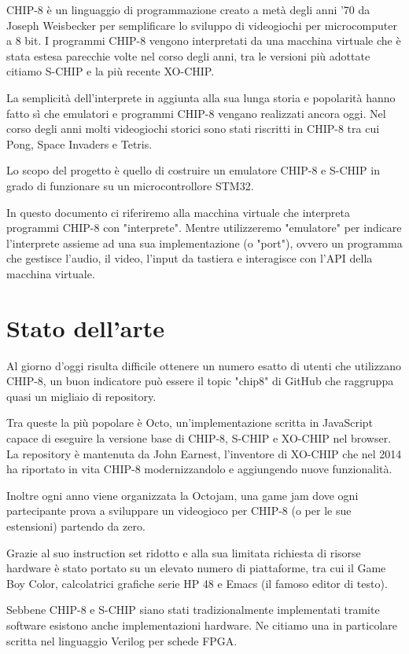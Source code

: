 \documentclass[a4paper]{article}
\begin{document}
CHIP-8 è un linguaggio di programmazione creato a metà degli anni '70
da Joseph Weisbecker per semplificare lo sviluppo di videogiochi per
microcomputer a 8 bit. I programmi CHIP-8 vengono interpretati da una
macchina virtuale che è stata estesa parecchie volte nel corso degli
anni, tra le versioni più adottate citiamo S-CHIP e la più recente
XO-CHIP.

La semplicità dell'interprete in aggiunta alla sua lunga storia e
popolarità hanno fatto sì che emulatori e programmi CHIP-8 vengano
realizzati ancora oggi.
Nel corso degli anni molti videogiochi storici sono stati riscritti
in CHIP-8 tra cui Pong, Space Invaders e Tetris.

Lo scopo del progetto è quello di costruire un emulatore CHIP-8 e
S-CHIP in grado di funzionare su un microcontrollore STM32.

In questo documento ci riferiremo alla macchina virtuale che
interpreta programmi CHIP-8 con "interprete". Mentre utilizzeremo
"emulatore" per indicare l'interprete assieme ad una sua
implementazione (o "port"), ovvero un programma che gestisce
l'audio, il video, l'input da tastiera e interagisce con l'API della
macchina virtuale.

\section{Stato dell'arte}

Al giorno d'oggi risulta difficile ottenere un numero esatto di utenti che utilizzano CHIP-8, un buon indicatore può essere il topic "chip8" di GitHub che raggruppa quasi un migliaio di repository.

Tra queste la più popolare è Octo, un'implementazione scritta in JavaScript capace di eseguire la versione base di CHIP-8, S-CHIP e XO-CHIP nel browser. La repository è mantenuta da John Earnest, l'inventore di XO-CHIP che nel 2014 ha riportato in vita CHIP-8 modernizzandolo e aggiungendo nuove funzionalità.

Inoltre ogni anno viene organizzata la Octojam, una game jam dove ogni partecipante prova a sviluppare un videogioco per CHIP-8 (o per le sue estensioni) partendo da zero.

Grazie al suo instruction set ridotto e alla sua limitata richiesta di risorse hardware è stato portato su un elevato numero di piattaforme, tra cui il Game Boy Color, calcolatrici grafiche serie HP 48 e Emacs (il famoso editor di testo).

Sebbene CHIP-8 e S-CHIP siano stati tradizionalmente implementati tramite software esistono anche implementazioni hardware. Ne citiamo una in particolare scritta nel linguaggio Verilog per schede FPGA.
\end{document}
